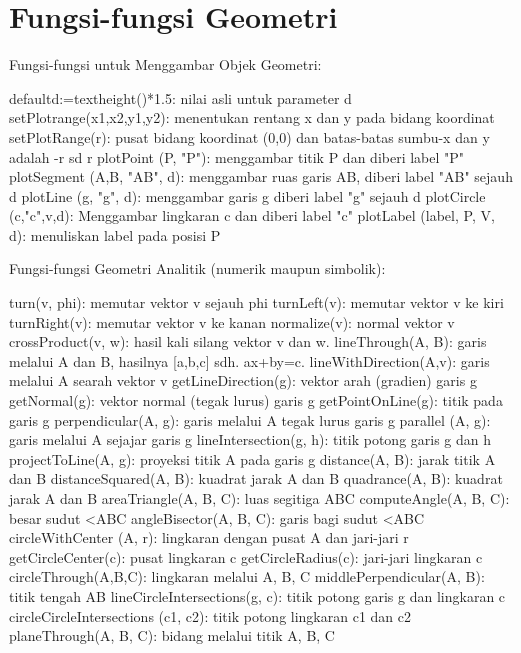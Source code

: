\documentclass[a4paper,11pt,oneside,enabledeprecatedfontcommands]{scrbook}
\newenvironment{eulernotebook}{}{}
\newcommand{\eulersubheading}[1]{\section{#1}}
\newenvironment{eulercomment}{\par\medskip\noindent}{\par\medskip}
\begin{document}
\begin{eulernotebook}
\eulersubheading{Fungsi-fungsi Geometri}
\begin{eulercomment}
Fungsi-fungsi untuk Menggambar Objek Geometri:
\end{eulercomment}
\begin{eulerttcomment}
defaultd:=textheight()*1.5: nilai asli untuk parameter d
setPlotrange(x1,x2,y1,y2): menentukan rentang x dan y pada bidang koordinat
setPlotRange(r): pusat bidang koordinat (0,0) dan batas-batas sumbu-x dan y adalah -r sd r
plotPoint (P, "P"): menggambar titik P dan diberi label "P"
plotSegment (A,B, "AB", d): menggambar ruas garis AB, diberi label "AB" sejauh d
plotLine (g, "g", d): menggambar garis g diberi label "g" sejauh d
plotCircle (c,"c",v,d): Menggambar lingkaran c dan diberi label "c"
plotLabel (label, P, V, d): menuliskan label pada posisi P
\end{eulerttcomment}
\begin{eulercomment}
Fungsi-fungsi Geometri Analitik (numerik maupun simbolik):
\end{eulercomment}
\begin{eulerttcomment}
turn(v, phi): memutar vektor v sejauh phi
turnLeft(v): memutar vektor v ke kiri
turnRight(v): memutar vektor v ke kanan
normalize(v): normal vektor v
crossProduct(v, w): hasil kali silang vektor v dan w.
lineThrough(A, B): garis melalui A dan B, hasilnya [a,b,c] sdh. ax+by=c.
lineWithDirection(A,v): garis melalui A searah vektor v
getLineDirection(g): vektor arah (gradien) garis g
getNormal(g): vektor normal (tegak lurus) garis g
getPointOnLine(g): titik pada garis g
perpendicular(A, g): garis melalui A tegak lurus garis g
parallel (A, g): garis melalui A sejajar garis g
lineIntersection(g, h): titik potong garis g dan h
projectToLine(A, g): proyeksi titik A pada garis g
distance(A, B): jarak titik A dan B
distanceSquared(A, B): kuadrat jarak A dan B
quadrance(A, B): kuadrat jarak A dan B
areaTriangle(A, B, C): luas segitiga ABC
computeAngle(A, B, C): besar sudut <ABC
angleBisector(A, B, C): garis bagi sudut <ABC
circleWithCenter (A, r): lingkaran dengan pusat A dan jari-jari r
getCircleCenter(c): pusat lingkaran c
getCircleRadius(c): jari-jari lingkaran c
circleThrough(A,B,C): lingkaran melalui A, B, C
middlePerpendicular(A, B): titik tengah AB
lineCircleIntersections(g, c): titik potong garis g dan lingkaran c
circleCircleIntersections (c1, c2): titik potong lingkaran c1 dan c2
planeThrough(A, B, C): bidang melalui titik A, B, C
\end{eulerttcomment}
\begin{eulercomment}

\end{eulercomment}
\end{eulernotebook}
\end{document}
